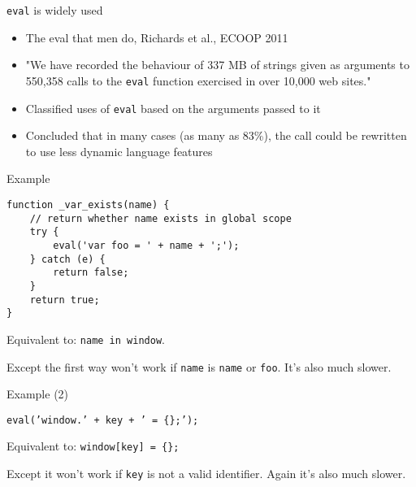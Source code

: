 \documentclass{beamer}
\begin{document}
\begin{frame}{{\tt eval} is widely used}
\begin{itemize}
\item The eval that men do, Richards et al., ECOOP 2011
\item "We have recorded the behaviour of 337 MB of strings given as
arguments to 550,358 calls to the {\tt eval} function exercised in over
10,000 web sites."
\item Classified uses of {\tt eval} based on the arguments passed to it
\item Concluded that in many cases (as many as 83\%), the call could be
rewritten to use less dynamic language features
\end{itemize}
\end{frame}

\begin{frame}[fragile]{Example}
\begin{verbatim}
function _var_exists(name) {
    // return whether name exists in global scope
    try {
        eval('var foo = ' + name + ';');
    } catch (e) {
        return false;
    }
    return true;
}
\end{verbatim}
\pause
\vspace{5mm}
Equivalent to: {\tt name in window}.

Except the first way won't work if {\tt name} is {\tt name} or {\tt foo}. 
It's also much slower.
\end{frame}

\begin{frame}{Example (2)}

{\tt eval('window.' + key + ' = \{\};'); }

\pause
\vspace{5mm}
Equivalent to: {\tt window[key] = \{\};}

Except it won't work if {\tt key} is not a valid identifier. Again it's
also much slower.

\end{frame}
\end{document}
